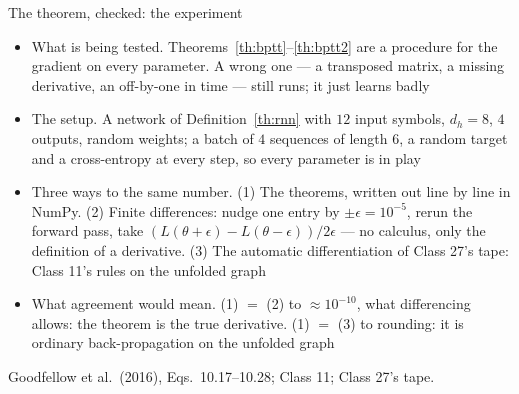 \documentclass[aspectratio=169, 11pt]{beamer}
\newcommand{\srcline}[1]{%
  \par\vspace{0.25em}%
  {\scriptsize\color{mcMuted}\hfill #1\par}}
\begin{document}
\begin{frame}{The theorem, checked: the experiment}
  \vspace{-0.15em}
  {\footnotesize
  \begin{itemize}\itemsep0.28em
    \item \alert{What is being tested.} Theorems~\ref{th:bptt}--\ref{th:bptt2}
          are a procedure for the gradient on every parameter. A wrong one
          --- a transposed matrix, a missing derivative, an off-by-one in
          time --- still runs; it just learns badly
    \item \alert{The setup.} A network of Definition~\ref{th:rnn} with
          $12$ input symbols, $d_h = 8$, $4$ outputs, random weights; a
          batch of $4$ sequences of length $6$, a random target and a
          cross-entropy at every step, so every parameter is in play
    \item \alert{Three ways to the same number.} (1) The theorems, written
          out line by line in NumPy. (2) \alert{Finite differences}: nudge one
          entry by $\pm\epsilon = 10^{-5}$, rerun the forward pass, take
          $(L(\theta + \epsilon) - L(\theta - \epsilon))/2\epsilon$ --- no
          calculus, only the definition of a derivative. (3) The automatic
          differentiation of Class 27's tape: Class 11's rules on the
          unfolded graph
    \item \alert{What agreement would mean.} (1) $=$ (2) to $\approx 10^{-10}$,
          what differencing allows: the theorem is the true derivative.
          (1) $=$ (3) to rounding: it is ordinary back-propagation on the
          unfolded graph
  \end{itemize}}
  \srcline{Goodfellow et al.\ (2016), Eqs.~10.17--10.28; Class 11; Class 27's tape.}
\end{frame}
\end{document}
